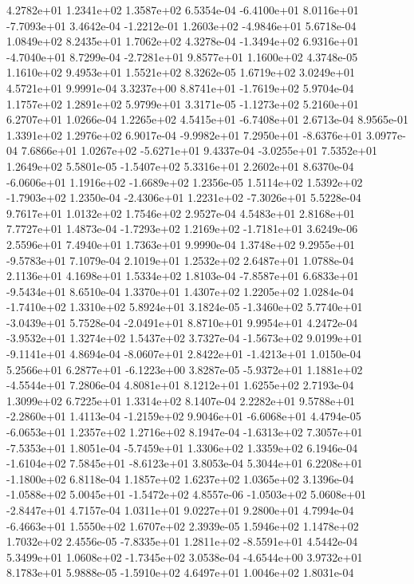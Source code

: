 4.2782e+01 1.2341e+02 1.3587e+02  6.5354e-04
-6.4100e+01  8.0116e+01 -7.7093e+01  3.4642e-04
-1.2212e-01  1.2603e+02 -4.9846e+01  5.6718e-04
1.0849e+02 8.2435e+01 1.7062e+02  4.3278e-04
-1.3494e+02  6.9316e+01 -4.7040e+01  8.7299e-04
-2.7281e+01  9.8577e+01  1.1600e+02  4.3748e-05
1.1610e+02 9.4953e+01 1.5521e+02  8.3262e-05
1.6719e+02 3.0249e+01 4.5721e+01  9.9991e-04
 3.3237e+00  8.8741e+01 -1.7619e+02  5.9704e-04
1.1757e+02 1.2891e+02 5.9799e+01  3.3171e-05
-1.1273e+02  5.2160e+01  6.2707e+01  1.0266e-04
 1.2265e+02  4.5415e+01 -6.7408e+01  2.6713e-04
8.9565e-01 1.3391e+02 1.2976e+02  6.9017e-04
-9.9982e+01  7.2950e+01 -8.6376e+01  3.0977e-04
 7.6866e+01  1.0267e+02 -5.6271e+01  9.4337e-04
-3.0255e+01  7.5352e+01  1.2649e+02  5.5801e-05
-1.5407e+02  5.3316e+01  2.2602e+01  8.6370e-04
-6.0606e+01  1.1916e+02 -1.6689e+02  1.2356e-05
 1.5114e+02  1.5392e+02 -1.7903e+02  1.2350e-04
-2.4306e+01  1.2231e+02 -7.3026e+01  5.5228e-04
9.7617e+01 1.0132e+02 1.7546e+02  2.9527e-04
4.5483e+01 2.8168e+01 7.7727e+01  1.4873e-04
-1.7293e+02  1.2169e+02 -1.7181e+01  3.6249e-06
2.5596e+01 7.4940e+01 1.7363e+01  9.9990e-04
 1.3748e+02  9.2955e+01 -9.5783e+01  7.1079e-04
2.1019e+01 1.2532e+02 2.6487e+01  1.0788e-04
2.1136e+01 4.1698e+01 1.5334e+02  1.8103e-04
-7.8587e+01  6.6833e+01 -9.5434e+01  8.6510e-04
1.3370e+01 1.4307e+02 1.2205e+02  1.0284e-04
-1.7410e+02  1.3310e+02  5.8924e+01  3.1824e-05
-1.3460e+02  5.7740e+01 -3.0439e+01  5.7528e-04
-2.0491e+01  8.8710e+01  9.9954e+01  4.2472e-04
-3.9532e+01  1.3274e+02  1.5437e+02  3.7327e-04
-1.5673e+02  9.0199e+01 -9.1141e+01  4.8694e-04
-8.0607e+01  2.8422e+01 -1.4213e+01  1.0150e-04
 5.2566e+01  6.2877e+01 -6.1223e+00  3.8287e-05
-5.9372e+01  1.1881e+02 -4.5544e+01  7.2806e-04
4.8081e+01 8.1212e+01 1.6255e+02  2.7193e-04
1.3099e+02 6.7225e+01 1.3314e+02  8.1407e-04
 2.2282e+01  9.5788e+01 -2.2860e+01  1.4113e-04
-1.2159e+02  9.9046e+01 -6.6068e+01  4.4794e-05
-6.0653e+01  1.2357e+02  1.2716e+02  8.1947e-04
-1.6313e+02  7.3057e+01 -7.5353e+01  1.8051e-04
-5.7459e+01  1.3306e+02  1.3359e+02  6.1946e-04
-1.6104e+02  7.5845e+01 -8.6123e+01  3.8053e-04
 5.3044e+01  6.2208e+01 -1.1800e+02  6.8118e-04
1.1857e+02 1.6237e+02 1.0365e+02  3.1396e-04
-1.0588e+02  5.0045e+01 -1.5472e+02  4.8557e-06
-1.0503e+02  5.0608e+01 -2.8447e+01  4.7157e-04
1.0311e+01 9.0227e+01 9.2800e+01  4.7994e-04
-6.4663e+01  1.5550e+02  1.6707e+02  2.3939e-05
1.5946e+02 1.1478e+02 1.7032e+02  2.4556e-05
-7.8335e+01  1.2811e+02 -8.5591e+01  4.5442e-04
 5.3499e+01  1.0608e+02 -1.7345e+02  3.0538e-04
-4.6544e+00  3.9732e+01  8.1783e+01  5.9888e-05
-1.5910e+02  4.6497e+01  1.0046e+02  1.8031e-04
